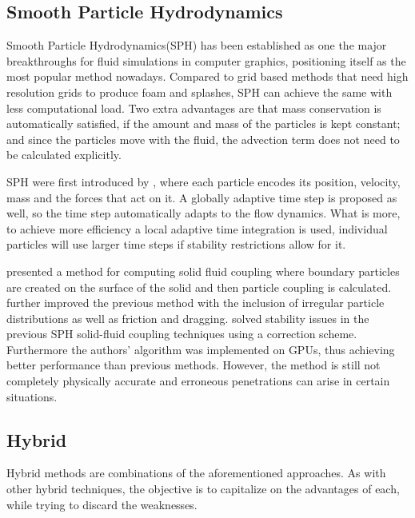 \subsection{Smooth Particle Hydrodynamics}

Smooth Particle Hydrodynamics(SPH) has been established as one the major breakthroughs for fluid simulations in computer graphics, positioning itself as the most popular method nowadays.
Compared to grid based methods that need high resolution grids to produce foam and splashes, SPH can achieve the same with less computational load.
Two extra advantages are that mass conservation is automatically satisfied, if the amount and mass of the particles is kept constant;
and since the particles move with the fluid, the advection term does not need to be calculated explicitly.

SPH were first introduced by \cite{DesbrunMathieuandGascuel1996}, where each particle encodes its position, velocity, mass and the forces that act on it.
A globally adaptive time step is proposed as well, so the time step automatically adapts to the flow dynamics.
What is more, to achieve more efficiency a local adaptive time integration is used, individual particles will use larger time steps if stability restrictions allow for it.

\cite{Muller2004} presented a method for computing solid fluid coupling where boundary particles are created on the surface of the solid and then particle coupling is calculated.
\cite{Akinci2012} further improved the previous method with the inclusion of irregular particle distributions as well as friction and dragging. 
\cite{Shao2014} solved stability issues in the previous SPH solid-fluid coupling techniques using a correction scheme.
Furthermore the authors' algorithm was implemented on GPUs, thus achieving better performance than previous methods.  
However, the method is still not completely physically accurate and erroneous penetrations can arise in certain situations. 

\subsection{Hybrid}

Hybrid methods are combinations of the aforementioned approaches.
As with other hybrid techniques, the objective is to capitalize on the advantages of each, while trying to discard the weaknesses.

